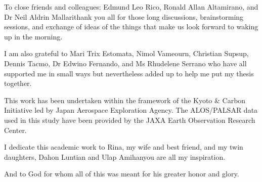 To close friends and colleagues: Edmund Leo Rico, Ronald Allan Altamirano, and Dr Neil Aldrin Mallari\textemdash thank you all for those long discussions, brainstorming sessions, and exchange of ideas of the things that make us look forward to waking up in the morning.

I am also grateful to Mari Trix Estomata, Nimol Vameourn, Christian Supsup, Dennis Tacmo, Dr Edwino Fernando, and Ms Rhudelene Serrano who have all supported me in small ways but nevertheless added up to help me put my thesis together.

This work has been undertaken within the framework of the Kyoto \& Carbon Initiative led by Japan Aerospace Exploration Agency. The ALOS/PALSAR data used in this study have been provided by the JAXA Earth Observation Research Center.

I dedicate this academic work to Rina, my wife and best friend, and my twin daughters, Dahon Luntian and Ulap Amihan\textemdash you are all my inspiration.

And to God for whom all of this was meant for his greater honor and glory.